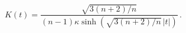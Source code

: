 \begin{equation} K(t) =
	    \frac{\sqrt{3(n+2)/n}}{(n-1)\kappa \sinh
	    (\sqrt{3(n+2)/n}\, |t|)}\, .  \end{equation} 
